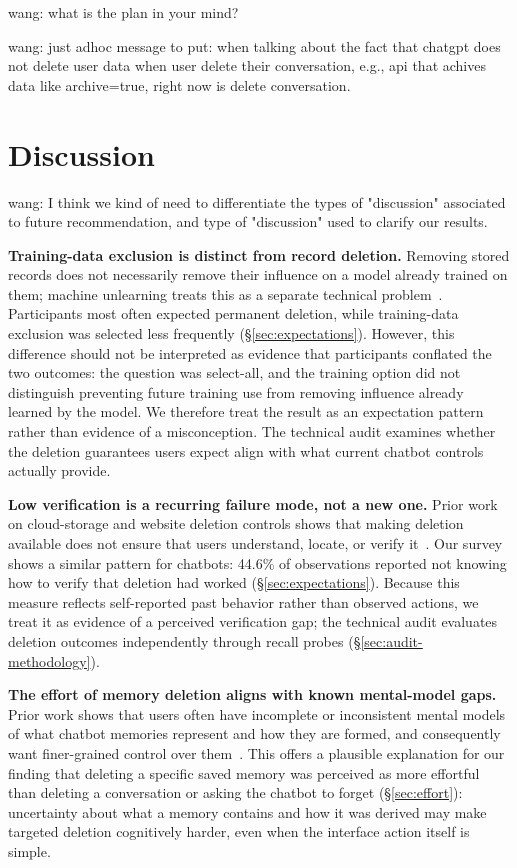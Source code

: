 \documentclass[conference,compsoc]{IEEEtran}
\newcommand{\xw}[1] {{\color{red}wang: #1}}
\begin{document}
\xw{what is the plan in your mind?}


\xw{just adhoc message to put: when talking about the fact that chatgpt does not delete user data when user delete their conversation, e.g., api that achives data like archive=true, right now is delete conversation.}



\section{Discussion}
\label{sec:discussion}

\xw{I think we kind of need to differentiate the types of "discussion" associated to future recommendation, and type of "discussion" used to clarify our results.}

\textbf{Training-data exclusion is distinct from record deletion.} Removing stored records does not necessarily remove their influence on a model already trained on them; machine unlearning treats this as a separate technical problem~\cite{bourtoule2021machine}. Participants most often expected permanent deletion, while training-data exclusion was selected less frequently (\S\ref{sec:expectations}). However, this difference should not be interpreted as evidence that participants conflated the two outcomes: the question was select-all, and the training option did not distinguish preventing future training use from removing influence already learned by the model. We therefore treat the result as an expectation pattern rather than evidence of a misconception. The technical audit examines whether the deletion guarantees users expect align with what current chatbot controls actually provide.

\textbf{Low verification is a recurring failure mode, not a new one.} Prior work on cloud-storage and website deletion controls shows that making deletion available does not ensure that users understand, locate, or verify it~\cite{ramokapane2017stupid,habib2019empirical}. Our survey shows a similar pattern for chatbots: 44.6\% of observations reported not knowing how to verify that deletion had worked (\S\ref{sec:expectations}). Because this measure reflects self-reported past behavior rather than observed actions, we treat it as evidence of a perceived verification gap; the technical audit evaluates deletion outcomes independently through recall probes (\S\ref{sec:audit-methodology}).

\textbf{The effort of memory deletion aligns with known mental-model gaps.} Prior work shows that users often have incomplete or inconsistent mental models of what chatbot memories represent and how they are formed, and consequently want finer-grained control over them~\cite{zhang2025understanding}. This offers a plausible explanation for our finding that deleting a specific saved memory was perceived as more effortful than deleting a conversation or asking the chatbot to forget (\S\ref{sec:effort}): uncertainty about what a memory contains and how it was derived may make targeted deletion cognitively harder, even when the interface action itself is simple.
\end{document}
